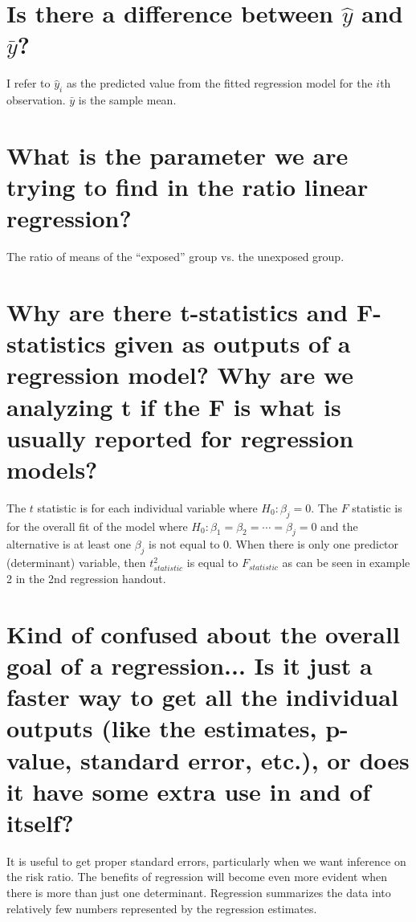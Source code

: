 \documentclass[landscape,twocolumn,letterpaper,9pt,reqno]{article}
\begin{document}
\section{Is there a difference between $\hat{y}$ and $\bar{y}$?}

I refer to $\hat{y}_i$ as the predicted value from the fitted regression model for the $i$th observation. $\bar{y}$ is the sample mean. 


\section{What is the parameter we are trying to find in the ratio linear regression?}

The ratio of means of the ``exposed'' group vs. the unexposed group. 



\section{Why are there t-statistics and F-statistics given as outputs of a regression model? Why are we analyzing t if the F is what is usually reported for regression models?}

The $t$ statistic is for each individual variable where $H_0: \beta_j = 0$. The $F$ statistic is for the overall fit of the model where $H_0: \beta_1 = \beta_2 = \cdots = \beta_j = 0$ and the alternative is at least one $\beta_j$ is not equal to 0. When there is only one predictor (determinant) variable, then $t_{statistic}^2$ is equal to $F_{statistic}$ as can be seen in example 2 in the 2nd regression handout.  

\section{Kind of confused about the overall goal of a regression... Is it just a faster way to get all the individual outputs (like the estimates, p-value, standard error, etc.), or does it have some extra use in and of itself?}

It is useful to get proper standard errors, particularly when we want inference on the risk ratio. The benefits of regression will become even more evident when there is more than just one determinant. Regression summarizes the data into relatively few numbers represented by the regression estimates. 
\end{document}
